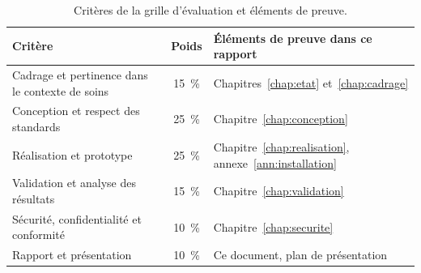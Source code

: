 \begin{table}[H]
\centering
\caption{Critères de la grille d'évaluation et éléments de preuve.}
\label{tab:criteres}
\small
\begin{tabularx}{\textwidth}{@{}X c X@{}}
\toprule
\textbf{Critère} & \textbf{Poids} & \textbf{Éléments de preuve dans ce rapport} \\
\midrule
Cadrage et pertinence dans le contexte de soins & 15~\% & Chapitres~\ref{chap:etat} et~\ref{chap:cadrage} \\
Conception et respect des standards & 25~\% & Chapitre~\ref{chap:conception} \\
Réalisation et prototype & 25~\% & Chapitre~\ref{chap:realisation}, annexe~\ref{ann:installation} \\
Validation et analyse des résultats & 15~\% & Chapitre~\ref{chap:validation} \\
Sécurité, confidentialité et conformité & 10~\% & Chapitre~\ref{chap:securite} \\
Rapport et présentation & 10~\% & Ce document, plan de présentation \\
\bottomrule
\end{tabularx}
\end{table}
